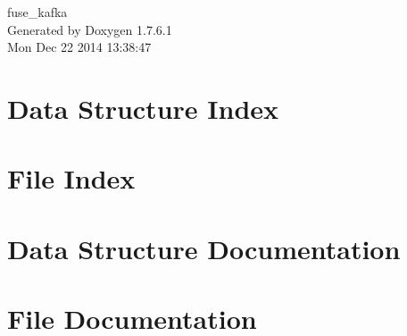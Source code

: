 \documentclass[a4paper]{book}
\begin{document}
\hypersetup{pageanchor=false,citecolor=blue}
\begin{titlepage}
\vspace*{7cm}
\begin{center}
{\Large fuse\-\_\-kafka }\\
\vspace*{1cm}
{\large \-Generated by Doxygen 1.7.6.1}\\
\vspace*{0.5cm}
{\small Mon Dec 22 2014 13:38:47}\\
\end{center}
\end{titlepage}
\clearemptydoublepage
{}
\tableofcontents
\clearemptydoublepage
{}
\hypersetup{pageanchor=true,citecolor=blue}
\chapter{\-Data \-Structure \-Index}

\chapter{\-File \-Index}

\chapter{\-Data \-Structure \-Documentation}
















\chapter{\-File \-Documentation}








\printindex
\end{document}
